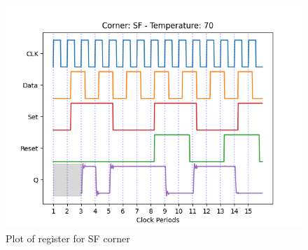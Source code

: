 \begin{figure}[H]
    \centering
    \begin{minipage}{0.5\textwidth}
        \centering
        \includegraphics[width=\textwidth]{Figures/Aimspice_Plots/SF_70.png}
        \caption{Plot of register for SF corner}
        \label{fig:SF70}
    \end{minipage}%
\end{figure}

